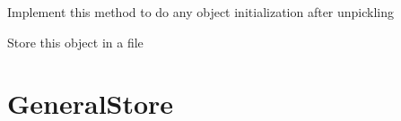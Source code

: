 \documentclass[letterpaper,10pt,english]{sphinxmanual}
\begin{document}
\begin{fulllineitems}
\begin{fulllineitems}
\end{fulllineitems}


\begin{fulllineitems}
\label{common:serge.serialize.Serializable.init}
Implement this method to do any object initialization after unpickling

\end{fulllineitems}


\begin{fulllineitems}
\label{common:serge.serialize.Serializable.toFile}
Store this object in a file

\end{fulllineitems}


\end{fulllineitems}



\section{GeneralStore}
\label{common:generalstore}
\end{document}
